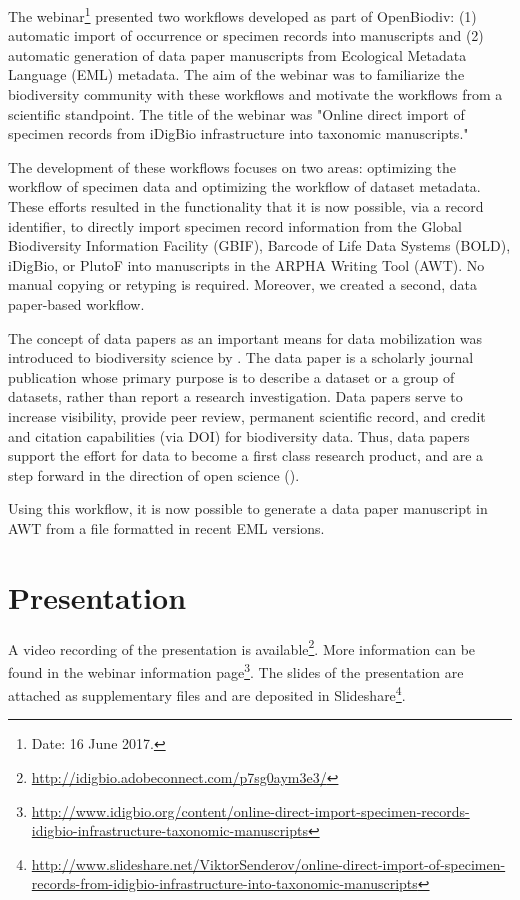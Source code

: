 The webinar\footnote{Date: 16 June 2017.} presented two workflows developed as part of OpenBiodiv: (1) automatic import of occurrence or specimen records into manuscripts and (2) automatic generation of data paper manuscripts from Ecological Metadata Language (EML) metadata. The aim of the webinar was to familiarize the biodiversity community with these workflows and motivate the workflows from a scientific standpoint. The title of the webinar was "Online direct import of specimen records from iDigBio infrastructure into taxonomic manuscripts."

The development of these workflows focuses on two areas: optimizing the workflow of specimen data and optimizing the workflow of dataset metadata. These efforts resulted in the functionality that it is now possible, via a record identifier, to directly import specimen record information from the Global Biodiversity Information Facility (GBIF), Barcode of Life Data Systems (BOLD), iDigBio, or PlutoF into manuscripts in the ARPHA Writing Tool (AWT). No manual copying or retyping is required. Moreover, we created a second, data paper-based workflow.

The concept of data papers as an important means for data mobilization was introduced to biodiversity science by \cite{chavan_data_2011}. The data paper is a scholarly journal publication whose primary purpose is to describe a dataset or a group of datasets, rather than report a research investigation. Data papers serve to increase visibility, provide peer review, permanent scientific record, and credit and citation capabilities (via DOI) for biodiversity data. Thus, data papers support the effort for data to become a first class research product, and are a step forward in the direction of open science (\cite{chavan_data_2011,chavan_cultural_2013}).

Using this workflow, it is now possible to generate a data paper manuscript in AWT from a file formatted in recent EML versions.

\section{Presentation}

A video recording of the presentation is available\footnote{\url{http://idigbio.adobeconnect.com/p7sg0aym3e3/}}. More information can be found in the webinar information page\footnote{\url{http://www.idigbio.org/content/online-direct-import-specimen-records-idigbio-infrastructure-taxonomic-manuscripts}}. The slides of the presentation are attached as supplementary files and are deposited in Slideshare\footnote{\url{http://www.slideshare.net/ViktorSenderov/online-direct-import-of-specimen-records-from-idigbio-infrastructure-into-taxonomic-manuscripts}}.

